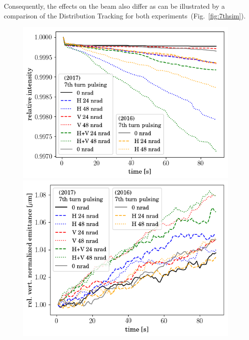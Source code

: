 \documentclass[%
 reprint,
 amsmath,amssymb,
 aps,
prstab,
]{revtex4-1}
\begin{document}
Consequently, the effects on the beam also differ as can be illustrated by a comparison of the Distribution Tracking for both experiments~(Fig.~\ref{fig:7thsim}).
\begin{figure}[h]
	\begin{minipage}[t]{0.49\linewidth}
		\centering
		\includegraphics[width=1.0\linewidth]{2016+2017injerra2b2uran1_2e-3_7th_3_5um_intensity.png}
	\end{minipage}
	\begin{minipage}[t]{0.49\linewidth}
		\centering
		\includegraphics[width=1.0\linewidth]{2016+2017injerra2b2uran1_2e-3_7th_3_5um_rel_emit2.png}
	\end{minipage}
	\begin{minipage}[t]{0.49\linewidth}

\end{minipage}
\end{figure}
\end{document}
